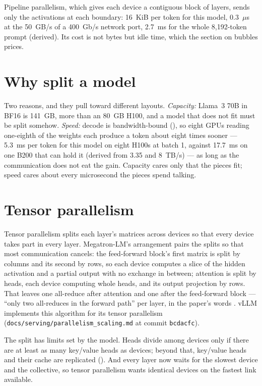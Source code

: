 Pipeline parallelism, which gives each device a contiguous block of layers,
sends only the activations at each boundary: 16~KiB per token for this model,
0.3~$\mu$s at the 50~GB/s of a 400~Gb/s network port, 2.7~ms for the whole
8,192-token prompt (derived). Its cost is not bytes but idle time, which the
section on bubbles prices.

\section{Why split a model}

Two reasons, and they pull toward different layouts. \emph{Capacity:} Llama~3
70B in BF16 is 141~GB, more than an 80~GB H100, and a model that does not fit
must be split somehow. \emph{Speed:} decode is bandwidth-bound
(), so eight GPUs reading one-eighth of the weights each produce
a token about eight times sooner --- 5.3~ms per token for this model on eight
H100s at batch 1, against 17.7~ms on one B200 that can hold it (derived from
3.35 and 8~TB/s) --- as long as the communication does not eat the gain.
Capacity cares only that the pieces fit; speed cares about every microsecond the
pieces spend talking.

\section{Tensor parallelism}

Tensor parallelism splits each layer's matrices across devices so that every
device takes part in every layer. Megatron-LM's arrangement pairs the splits so
that most communication cancels: the feed-forward block's first matrix is split
by columns and its second by rows, so each device computes a slice of the
hidden activation and a partial output with no exchange in between; attention
is split by heads, each device computing whole heads, and its output
projection by rows. That leaves one all-reduce after attention and one after
the feed-forward block --- ``only two all-reduces in the forward path'' per
layer, in the paper's words \cite{shoeybi2019megatron}. vLLM implements this
algorithm for its tensor parallelism (\texttt{docs/serving/parallelism\_scaling.md}
at commit \texttt{bcdacfc}).

The split has limits set by the model. Heads divide among devices only if there
are at least as many key/value heads as devices; beyond that, key/value heads
and their cache are replicated (). And every layer now waits
for the slowest device and the collective, so tensor parallelism wants
identical devices on the fastest link available.

